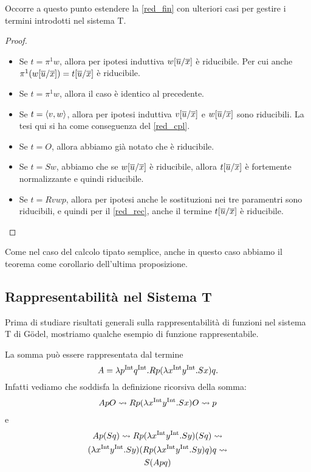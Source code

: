 \documentclass[]{marticle}
\begin{document}
Occorre a questo punto estendere la \ref{red_fin} con ulteriori casi per
gestire i termini introdotti nel sistema T.

\begin{proof}
    \begin{itemize}
        \item Se $t = \pi^1 w$, allora per ipotesi induttiva
            $w[\overline{u}/\overline{x}]$ \`e riducibile. Per cui anche 
            $\pi^1 (w[\overline{u}/\overline{x}]) = t [\overline{u}/\overline{x}]$ \`e riducibile.
        \item Se $t = \pi^1 w$, allora il caso \`e identico al precedente.
        \item Se $t = \langle v,w \rangle$, allora per ipotesi induttiva
            $v[\overline{u}/\overline{x}]$ e $w[\overline{u}/\overline{x}]$ sono riducibili. La tesi qui si ha come conseguenza
            del \ref{red_cpl}.
        \item Se $t=O$, allora abbiamo gi\`a notato che \`e riducibile.
        \item Se $t = Sw$, abbiamo che se $w[\overline{u}/\overline{x}]$
            \`e riducibile, allora $t[\overline{u}/\overline{x}]$ \`e
            fortemente normalizzante e quindi riducibile.
        \item Se $t = Rvwp$, allora per ipotesi anche le sostituzioni nei tre
            paramentri sono riducibili, e quindi per il \ref{red_rec}, anche il
            termine $t[\overline{u}/\overline{x}]$ \`e riducibile.
    \end{itemize}
\end{proof}

Come nel caso del calcolo tipato semplice, anche in questo caso abbiamo il
teorema come corollario dell'ultima proposizione.

\subsection{Rappresentabilit\`a nel Sistema T}

Prima di studiare risultati generali sulla rappresentabilit\`a di funzioni nel
sistema T di G\"odel, mostriamo qualche esempio di funzione rappresentabile.

La somma pu\`o essere rappresentata dal termine
\[
    A = \lambda p^{\text{Int}} q^{\text{Int}}. Rp (\lambda x^{\text{Int}} y^{\text{Int}}. Sx) q.
\]
Infatti vediamo che soddisfa la definizione ricorsiva della somma:
\begin{gather*}
    ApO \rightsquigarrow R p (\lambda x^{\text{Int}} y^{\text{Int}}. Sx) O \rightsquigarrow p
\end{gather*}
e 
\begin{gather*}
    Ap(Sq) \rightsquigarrow R p (\lambda x^{\text{Int}} y^{\text{Int}}. Sy) (Sq) \rightsquigarrow \\ (\lambda x^{\text{Int}} y^{\text{Int}}.
    Sy)(R p (\lambda x^{\text{Int}} y^{\text{Int}}. Sy) q) q \rightsquigarrow \\
    S (A pq)
\end{gather*}
\end{document}
